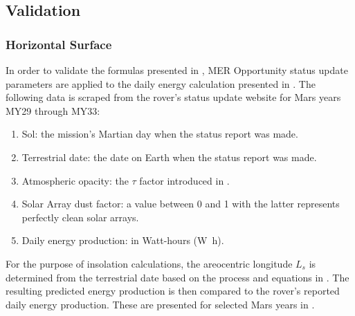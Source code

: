 \subsection{Validation}
\label{sec:PowerAndEnergyPredictions:Validation}


\subsubsection{Horizontal Surface}
\label{sec:PowerAndEnergyPredictions:Validation:HorizontalSurface}

In order to validate the formulas presented in , \ac{MER} Opportunity status update parameters are applied to the daily energy calculation presented in . The following data is scraped from the rover's status update website for Mars years MY29 through MY33:

\begin{enumerate}[label=\textbf{\textcolor{BulletBlue}{(\alph*)}}]
  \item Sol: the mission's Martian day when the status report was made.
  \item Terrestrial date: the date on Earth when the status report was made.
  \item Atmospheric opacity: the $\tau$ factor introduced in  .
  \item Solar Array dust factor: a value between 0 and 1 with the latter represents perfectly clean solar arrays.
  \item Daily energy production: in Watt-hours (\si{\watt\hour}).
\end{enumerate}

For the purpose of insolation calculations, the areocentric longitude $L_{s}$ is determined from the terrestrial date based on the process and equations in . The resulting predicted energy production is then compared to the rover's reported daily energy production. These are presented for selected Mars years in .

